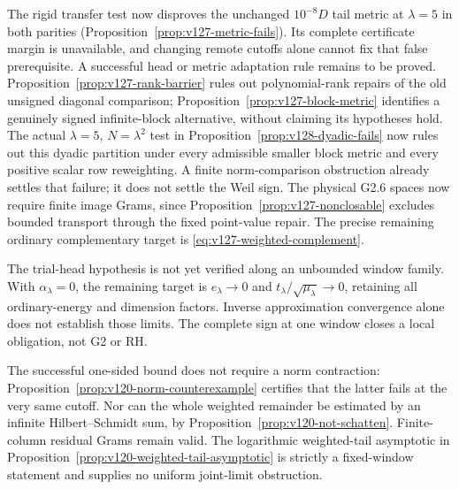 \documentclass[11pt]{article}
\theoremstyle{remark}
\begin{document}
The rigid transfer test now disproves the unchanged $10^{-8}D$
tail metric at $\lambda=5$ in both parities
(Proposition~\ref{prop:v127-metric-fails}). Its complete certificate
margin is unavailable, and changing remote cutoffs alone cannot fix
that false prerequisite. A successful head or metric adaptation rule
remains to be proved. Proposition~\ref{prop:v127-rank-barrier} rules
out polynomial-rank repairs of the old unsigned diagonal comparison;
Proposition~\ref{prop:v127-block-metric} identifies a genuinely signed
infinite-block alternative, without claiming its hypotheses hold.
The actual $\lambda=5$, $N=\lambda^2$ test in
Proposition~\ref{prop:v128-dyadic-fails} now rules out this dyadic
partition under every admissible smaller block metric and every
positive scalar row reweighting. A finite norm-comparison obstruction
already settles that failure; it does not settle the Weil sign.
The physical G2.6 spaces now require finite image Grams, since
Proposition~\ref{prop:v127-nonclosable} excludes bounded transport
through the fixed point-value repair. The precise remaining ordinary
complementary target is \eqref{eq:v127-weighted-complement}.

The trial-head hypothesis is not yet verified along an unbounded
window family. With $\alpha_\lambda=0$, the remaining target is
$e_\lambda\to0$ and $t_\lambda/\sqrt{\mu_\lambda}\to0$, retaining
all ordinary-energy and dimension factors. Inverse approximation
convergence alone does not establish those limits. The complete
sign at one window closes a local obligation, not G2 or RH.

The successful one-sided bound does not require a norm contraction:
Proposition~\ref{prop:v120-norm-counterexample} certifies that the
latter fails at the very same cutoff. Nor can the whole weighted
remainder be estimated by an infinite Hilbert--Schmidt sum, by
Proposition~\ref{prop:v120-not-schatten}. Finite-column residual Grams
remain valid. The logarithmic weighted-tail asymptotic in
Proposition~\ref{prop:v120-weighted-tail-asymptotic} is strictly a
fixed-window statement and supplies no uniform joint-limit obstruction.
\end{document}
